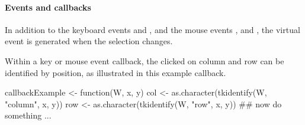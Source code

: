 
\paragraph{Events and callbacks}
In addition to the keyboard events  and
, and the mouse events ,
 and , the virtual event
 is generated when the selection changes.

Within a key or mouse event callback, the clicked on column and row can
be identified by position, as illustrated in this example callback.
\begin{Schunk}
\begin{Sinput}
 callbackExample <- function(W, x, y) {
   col <- as.character(tkidentify(W, "column", x, y))
   row <- as.character(tkidentify(W, "row", x, y))
   ## now do something ...
 }
\end{Sinput}
\end{Schunk}


